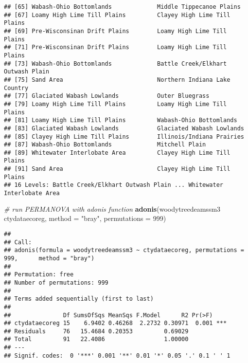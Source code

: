 \documentclass[
]{article}
\newenvironment{Shaded}{\begin{snugshade}}{\end{snugshade}}
\newcommand{\CommentTok}[1]{\textcolor[rgb]{0.56,0.35,0.01}{\textit{#1}}}
\newcommand{\DataTypeTok}[1]{\textcolor[rgb]{0.13,0.29,0.53}{#1}}
\newcommand{\DecValTok}[1]{\textcolor[rgb]{0.00,0.00,0.81}{#1}}
\newcommand{\KeywordTok}[1]{\textcolor[rgb]{0.13,0.29,0.53}{\textbf{#1}}}
\newcommand{\NormalTok}[1]{#1}
\newcommand{\OperatorTok}[1]{\textcolor[rgb]{0.81,0.36,0.00}{\textbf{#1}}}
\newcommand{\StringTok}[1]{\textcolor[rgb]{0.31,0.60,0.02}{#1}}
\begin{document}
\begin{verbatim}
## [65] Wabash-Ohio Bottomlands             Middle Tippecanoe Plains           
## [67] Loamy High Lime Till Plains         Clayey High Lime Till Plains       
## [69] Pre-Wisconsinan Drift Plains        Loamy High Lime Till Plains        
## [71] Pre-Wisconsinan Drift Plains        Loamy High Lime Till Plains        
## [73] Wabash-Ohio Bottomlands             Battle Creek/Elkhart Outwash Plain 
## [75] Sand Area                           Northern Indiana Lake Country      
## [77] Glaciated Wabash Lowlands           Outer Bluegrass                    
## [79] Loamy High Lime Till Plains         Loamy High Lime Till Plains        
## [81] Loamy High Lime Till Plains         Wabash-Ohio Bottomlands            
## [83] Glaciated Wabash Lowlands           Glaciated Wabash Lowlands          
## [85] Clayey High Lime Till Plains        Illinois/Indiana Prairies          
## [87] Wabash-Ohio Bottomlands             Mitchell Plain                     
## [89] Whitewater Interlobate Area         Clayey High Lime Till Plains       
## [91] Sand Area                           Clayey High Lime Till Plains       
## 16 Levels: Battle Creek/Elkhart Outwash Plain ... Whitewater Interlobate Area
\end{verbatim}

\begin{Shaded}
\begin{Highlighting}[]
\CommentTok{# run PERMANOVA with adonis function}
\KeywordTok{adonis}\NormalTok{(woodytreedeamssm3 }\OperatorTok{~}\StringTok{ }\NormalTok{ctydataecoreg, }\DataTypeTok{method =} \StringTok{"bray"}\NormalTok{, }\DataTypeTok{permutations =} \DecValTok{999}\NormalTok{)}
\end{Highlighting}
\end{Shaded}

\begin{verbatim}
## 
## Call:
## adonis(formula = woodytreedeamssm3 ~ ctydataecoreg, permutations = 999,      method = "bray") 
## 
## Permutation: free
## Number of permutations: 999
## 
## Terms added sequentially (first to last)
## 
##               Df SumsOfSqs MeanSqs F.Model      R2 Pr(>F)    
## ctydataecoreg 15    6.9402 0.46268  2.2732 0.30971  0.001 ***
## Residuals     76   15.4684 0.20353         0.69029           
## Total         91   22.4086                 1.00000           
## ---
## Signif. codes:  0 '***' 0.001 '**' 0.01 '*' 0.05 '.' 0.1 ' ' 1
\end{verbatim}
\end{document}
